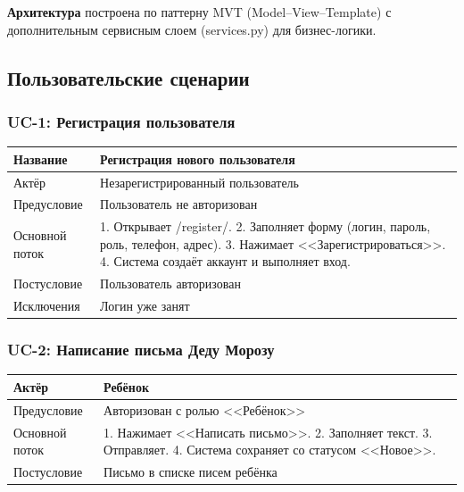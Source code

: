 \documentclass[14pt,a4paper]{extarticle}
\begin{document}
\textbf{Архитектура} построена по паттерну MVT (Model--View--Template) с дополнительным сервисным слоем (services.py) для бизнес-логики.

\subsection{Пользовательские сценарии}

\subsubsection{UC-1: Регистрация пользователя}

\begin{table}[H]
\centering
\small
\begin{tabular}{|L{3cm}|L{10cm}|}
\hline
Название & Регистрация нового пользователя \\
\hline
Актёр & Незарегистрированный пользователь \\
\hline
Предусловие & Пользователь не авторизован \\
\hline
Основной поток & 1. Открывает /register/. 2. Заполняет форму (логин, пароль, роль, телефон, адрес). 3. Нажимает <<Зарегистрироваться>>. 4. Система создаёт аккаунт и выполняет вход. \\
\hline
Постусловие & Пользователь авторизован \\
\hline
Исключения & Логин уже занят \\
\hline
\end{tabular}
\end{table}

\subsubsection{UC-2: Написание письма Деду Морозу}

\begin{table}[H]
\centering
\small
\begin{tabular}{|L{3cm}|L{10cm}|}
\hline
Актёр & Ребёнок \\
\hline
Предусловие & Авторизован с ролью <<Ребёнок>> \\
\hline
Основной поток & 1. Нажимает <<Написать письмо>>. 2. Заполняет текст. 3. Отправляет. 4. Система сохраняет со статусом <<Новое>>. \\
\hline
Постусловие & Письмо в списке писем ребёнка \\
\hline
\end{tabular}
\end{table}
\end{document}
